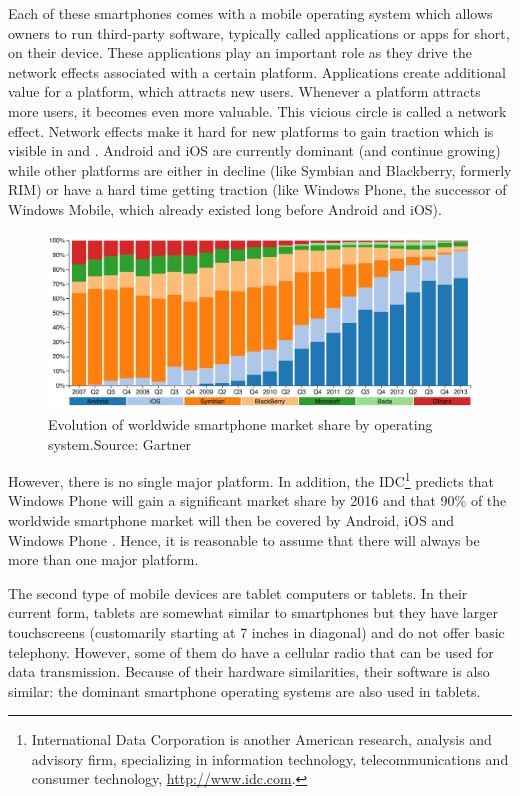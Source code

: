 Each of these smartphones comes with a mobile operating system which allows owners to run third-party software, typically called applications or apps for short, on their device. These applications play an important role as they drive the network effects associated with a certain platform. Applications create additional value for a platform, which attracts new users. Whenever a platform attracts more users, it becomes even more valuable. This vicious circle is called a network effect. Network effects make it hard for new platforms to gain traction which is visible in  and . Android and iOS are currently dominant (and continue growing) while other platforms are either in decline (like Symbian and Blackberry, formerly RIM) or have a hard time getting traction (like Windows Phone, the successor of Windows Mobile, which already existed long before Android and iOS).

\begin{figure}[h]
    \centering
    \includegraphics[width=\textwidth]{../resources/figs/smartphone_share.pdf}
    \caption{Evolution of worldwide smartphone market share by operating system.\newline Source: Gartner \citeGartner}
    \label{fig:smartphone-share}
\end{figure}

However, there is no single major platform. In addition, the IDC\footnote{International Data Corporation is another American research, analysis and advisory firm, specializing in information technology, telecommunications and consumer technology, \url{http://www.idc.com}.} predicts that Windows Phone will gain a significant market share by 2016 and that 90\% of the worldwide smartphone market will then be covered by Android, iOS and Windows Phone \cite{IDC:phone}. Hence, it is reasonable to assume that there will always be more than one major platform.

The second type of mobile devices are tablet computers or tablets. In their current form, tablets are somewhat similar to smartphones but they have larger touchscreens (customarily starting at 7 inches in diagonal) and do not offer basic telephony. However, some of them do have a cellular radio that can be used for data transmission. Because of their hardware similarities, their software is also similar: the dominant smartphone operating systems are also used in tablets.

